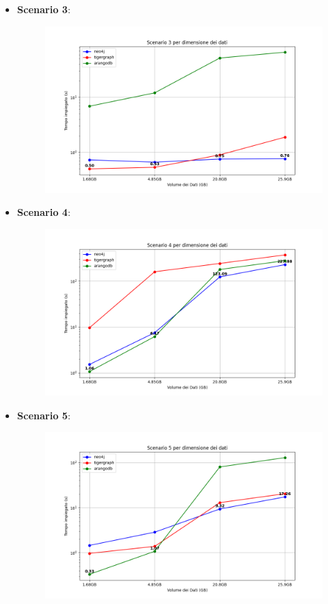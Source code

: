 \documentclass[11pt]{article}
\begin{document}
\begin{itemize}
    \newpage
    \item \textbf{Scenario 3}:
    \begin{figure}[!ht]
        \centering
        \includegraphics[width=\textwidth]{./images/plot_results/scenario3.png}
    \end{figure}

    
    \item \textbf{Scenario 4}:
    \begin{figure}[!ht]
        \centering
        \includegraphics[width=\textwidth]{./images/plot_results/scenario4.png}
    \end{figure}

    \newpage
    \item \textbf{Scenario 5}:
    \begin{figure}[!ht]
        \centering
        \includegraphics[width=\textwidth]{./images/plot_results/scenario5.png}
    \end{figure}
    

\end{itemize}
\end{document}

